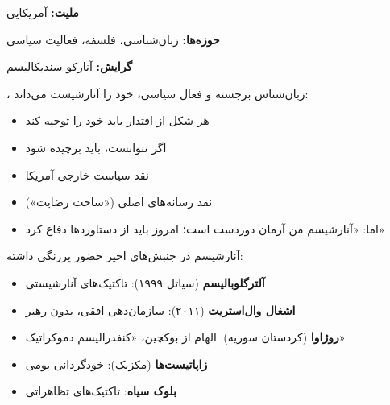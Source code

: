 \begin{personbox}

\textbf{ملیت:} آمریکایی

\textbf{حوزه‌ها:} زبان‌شناسی، فلسفه، فعالیت سیاسی

\textbf{گرایش:} آنارکو-سندیکالیسم

\mediumspace

، زبان‌شناس برجسته و فعال سیاسی، خود را آنارشیست می‌داند:

\begin{itemize}[nosep]
    \item هر شکل از اقتدار باید خود را توجیه کند
    \item اگر نتوانست، باید برچیده شود
    \item نقد سیاست خارجی آمریکا
    \item نقد رسانه‌های اصلی («ساخت رضایت»)
    \item اما: «آنارشیسم من آرمان دوردست است؛ امروز باید از دستاوردها دفاع کرد»
\end{itemize}
\end{personbox}

\begin{historybox}
آنارشیسم در جنبش‌های اخیر حضور پررنگی داشته:
\begin{itemize}[nosep]
    \item \textbf{آلترگلوبالیسم} (سیاتل ۱۹۹۹): تاکتیک‌های آنارشیستی
    \item \textbf{اشغال وال‌استریت} (۲۰۱۱): سازمان‌دهی افقی، بدون رهبر
    \item \textbf{روژاوا} (کردستان سوریه): الهام از بوکچین، «کنفدرالیسم دموکراتیک»
    \item \textbf{زاپاتیست‌ها} (مکزیک): خودگردانی بومی
    \item \textbf{بلوک سیاه}: تاکتیک‌های تظاهراتی
\end{itemize}
\end{historybox}


\newpage

